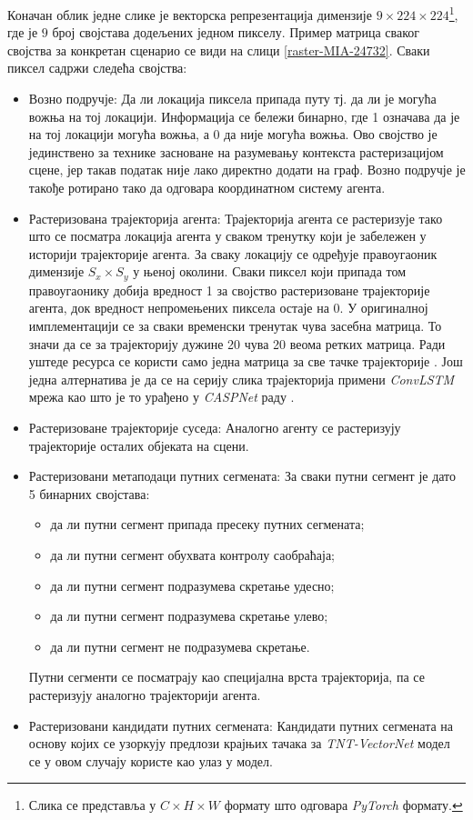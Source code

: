\documentclass[11pt,oneside]{memoir}
\begin{document}
Коначан облик једне слике је векторска репрезентација димензије 
$9\times 224\times 224$\footnote{Слика се представља у $C\times H\times W$ формату што одговара \textit{PyTorch} формату.}, 
где је $9$ број својстава додељених једном пикселу. Пример матрица сваког својства за конкретан сценарио се види на слици \ref{raster-MIA-24732}. 
Сваки пиксел садржи следећа својства:
\begin{itemize}
  \item Возно подручје: Да ли локација пиксела припада путу тј. да ли је могућа вожња на тој локацији. Информација се бележи бинарно, где
        1 означава да је на тој локацији могућа вожња, а 0 да није могућа вожња. Ово својство је јединствено за технике
        засноване на разумевању контекста растеризацијом сцене, јер такав податак није лако директно додати на граф. 
        Возно подручје је такође ротирано тако да одговара координатном систему агента.
  \item Растеризована трајекторија агента: Трајекторија агента се растеризује тако што се посматра локација агента
        у сваком тренутку који је забележен у историји трајекторије агента. За сваку локацију се одређује
        правоугаоник димензије $S_x\times S_y$ у њеној околини. 
        Сваки пиксел који припада том правоугаонику добија вредност 1 за својство растеризоване
        трајекторије агента, док вредност непромењених пиксела остаје на 0. 
        У оригиналној имплементацији се за сваки временски тренутак чува засебна матрица. То значи да се за трајекторију дужине 20 
        чува 20 веома ретких матрица. Ради уштеде ресурса се користи само једна матрица за све тачке трајекторије \cite{home}.
        Још једна алтернатива је да се на серију слика трајекторија примени \textit{ConvLSTM} мрежа као што је то урађено у \textit{CASPNet}
        раду \cite{caspnet}. 
  \item Растеризоване трајекторије суседа: Аналогно агенту се растеризују трајекторије осталих објеката на сцени.
  \item Растеризовани метаподаци путних сегмената: За сваки путни сегмент је дато 5 бинарних својстава:
        \begin{itemize}
          \item да ли путни сегмент припада пресеку путних сегмената;
          \item да ли путни сегмент обухвата контролу саобраћаја;
          \item да ли путни сегмент подразумева скретање удесно;
          \item да ли путни сегмент подразумева скретање улево;
          \item да ли путни сегмент не подразумева скретање.
        \end{itemize}
        Путни сегменти се посматрају као специјална врста трајекторија, па се растеризују аналогно трајекторији агента.
  \item Растеризовани кандидати путних сегмената: Кандидати путних сегмената на основу којих се узоркују предлози крајњих тачака
        за \textit{TNT-VectorNet} модел се у овом случају користе као улаз у модел. 
\end{itemize}
\end{document}
